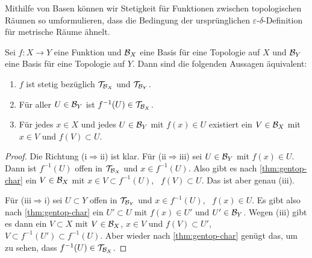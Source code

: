 Mithilfe von Basen können wir Stetigkeit für Funktionen zwischen topologischen
Räumen so umformulieren, dass die Bedingung der ursprünglichen
$\varepsilon$-$\delta$-Definition für metrische Räume ähnelt.
\begin{theorem}\label{thm:continuity}
Sei $f\colon X\to Y$ eine Funktion und $\cal B_X$ eine Basis für eine Topologie
auf $X$ und $\cal B_Y$ eine Basis für eine Topologie auf $Y$. Dann sind die
folgenden Aussagen äquivalent:
\begin{enumerate}
\item $f$ ist stetig bezüglich $\cal T_{\cal B_X}$ und $\cal T_{\cal B_Y}$.
\item Für aller $U\in\cal B_Y$ ist $f^{-1}(U)\in\cal T_{\cal B_X}$.
\item Für jedes $x\in X$ und jedes $U\in\cal B_Y$ mit $f(x)\in U$ existiert ein
$V\in\cal B_X$ mit $x\in V$ und $f(V)\subset U$.
\end{enumerate}
\end{theorem}
\begin{proof}
Die Richtung (i$\Rightarrow$ii) ist klar. Für (ii$\Rightarrow$iii) sei $U\in\cal
B_Y$ mit $f(x)\in U$. Dann ist $f^{-1}(U)$ offen in $\cal T_{\cal B_X}$ und
$x\in f^{-1}(U)$. Also gibt es nach \autoref{thm:gentop-char} ein $V\in\cal B_X$
mit $x\in V\subset f^{-1}(U)$, \ddh~$f(V)\subset U$. Das ist aber genau (iii).

Für (iii$\Rightarrow$i) sei $U\subset Y$ offen in $\cal T_{\cal B_Y}$ und $x\in
f^{-1}(U)$, \ddh~$f(x)\in U$. Es gibt also nach \autoref{thm:gentop-char} ein
$U'\subset U$ mit $f(x)\in U'$ und $U'\in\cal B_Y$. Wegen (iii) gibt es dann ein
$V\subset X$ mit $V\in\cal B_X$, $x\in V$ und $f(V)\subset U'$, \ddh~$V\subset
f^{-1}(U')\subset f^{-1}(U)$. Aber wieder nach \autoref{thm:gentop-char} genügt
das, um zu sehen, dass $f^{-1}(U)\in\cal T_{\cal B_X}$.
\end{proof}

